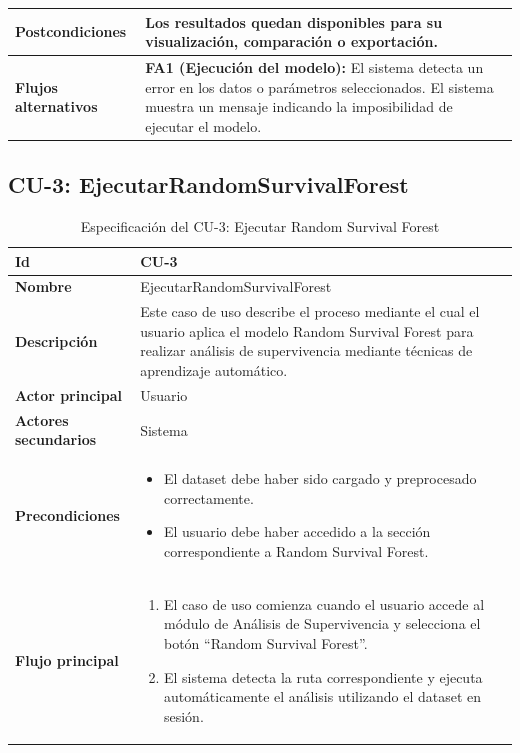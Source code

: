 \begin{longtable}{|p{4cm}|p{10cm}|}
\textbf{Postcondiciones} & 
Los resultados quedan disponibles para su visualización, comparación o exportación. \\ \hline

\textbf{Flujos alternativos} & 
\textbf{FA1 (Ejecución del modelo):} El sistema detecta un error en los datos o parámetros seleccionados. El sistema muestra un mensaje indicando la imposibilidad de ejecutar el modelo. \\ \hline

\end{longtable}
\newpage


    \subsection{CU-3: EjecutarRandomSurvivalForest}
        \small
\begin{longtable}{|p{4cm}|p{10cm}|}
\caption{Especificación del CU-3: Ejecutar Random Survival Forest}
\label{tab:esp_cu3}\\
\hline
\textbf{Id} & CU-3 \\ \hline
\textbf{Nombre} & EjecutarRandomSurvivalForest \\ \hline

\textbf{Descripción} & 
Este caso de uso describe el proceso mediante el cual el usuario aplica el modelo Random Survival Forest para realizar análisis de supervivencia mediante técnicas de aprendizaje automático. \\ \hline

\textbf{Actor principal} & Usuario \\ \hline
\textbf{Actores secundarios} & Sistema \\ \hline

\textbf{Precondiciones} & 
\begin{itemize}
    \item El dataset debe haber sido cargado y preprocesado correctamente.
    \item El usuario debe haber accedido a la sección correspondiente a Random Survival Forest.
\end{itemize} \\ \hline

\textbf{Flujo principal} & 
\begin{enumerate}
    \item El caso de uso comienza cuando el usuario accede al módulo de Análisis de Supervivencia y selecciona el botón ``Random Survival Forest''.
    
    \item El sistema detecta la ruta correspondiente y ejecuta automáticamente el análisis utilizando el dataset en sesión.
    

\end{enumerate}
\end{longtable}
